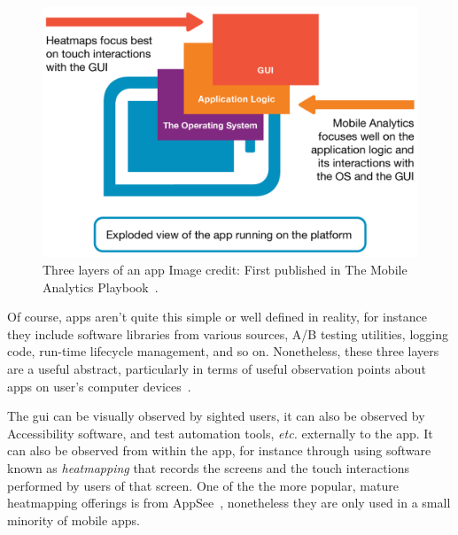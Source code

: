 \begin{figure}
    \includegraphics[width=\linewidth]{images/mobile-analytics-playbook/3-layers.pdf}
    \caption[Three layers of an app]{Three layers of an app {Image credit: First published in The Mobile Analytics Playbook~\cite{harty_aymer_playbook_2016}}.}
    \label{fig:3-layers}
\end{figure}

Of course, apps aren't quite this simple or well defined in reality, for instance they include software libraries from various sources, A/B testing utilities, logging code, run-time lifecycle management, and so on. Nonetheless, these three layers are a useful abstract, particularly in terms of useful observation points about apps on user's computer devices~.

The \Gls{gui} can be visually observed by sighted users, it can also be observed by Accessibility software, and test automation tools, \emph{etc.} externally to the app. It can also be observed from within the app, for instance through using software known as \emph{heatmapping} that records the screens and the touch interactions performed by users of that screen. One of the the more popular, mature heatmapping offerings is from AppSee~, nonetheless they are only used in a small minority of mobile apps.


